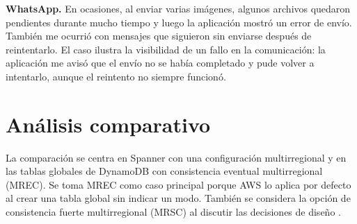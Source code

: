 \documentclass[11pt,a4paper]{article}
\begin{document}
\textbf{WhatsApp.} En ocasiones, al enviar varias imágenes, algunos archivos quedaron pendientes durante mucho tiempo y luego la aplicación mostró un error de envío. También me ocurrió con mensajes que siguieron sin enviarse después de reintentarlo. El caso ilustra la visibilidad de un fallo en la comunicación: la aplicación me avisó que el envío no se había completado y pude volver a intentarlo, aunque el reintento no siempre funcionó.

\section{Análisis comparativo}
La comparación se centra en Spanner con una configuración multirregional y en las tablas globales de DynamoDB con consistencia eventual multirregional (MREC). Se toma MREC como caso principal porque AWS lo aplica por defecto al crear una tabla global sin indicar un modo. También se considera la opción de consistencia fuerte multirregional (MRSC) al discutir las decisiones de diseño \cite{GoogleSpannerReplication,AWSGlobalTables}.
\end{document}
